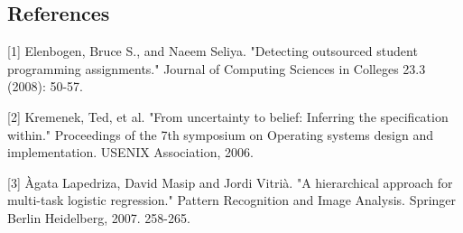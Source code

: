 \subsection*{References}

\small{
[1] Elenbogen, Bruce S., and Naeem Seliya. 
"Detecting outsourced student programming assignments." 
Journal of Computing Sciences in Colleges 23.3 (2008): 50-57.

[2] Kremenek, Ted, et al. 
"From uncertainty to belief: Inferring the specification within." 
Proceedings of the 7th symposium on Operating systems design and implementation. USENIX Association, 2006.

[3] {\`A}gata Lapedriza, David Masip and Jordi Vitri{\`a}.
"A hierarchical approach for multi-task logistic regression." 
Pattern Recognition and Image Analysis. Springer Berlin Heidelberg, 2007. 258-265.
}

